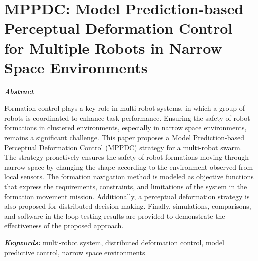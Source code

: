 \chapter{MPPDC: Model Prediction-based Perceptual Deformation Control for Multiple Robots in Narrow Space Environments}\label{paper3}

\vspace{1cm}

\noindent\textit{\textbf{Abstract}}

Formation control plays a key role in multi-robot systems, in which a group of robots is coordinated to enhance task performance. Ensuring the safety of robot formations in clustered environments, especially in narrow space environments, remains a significant challenge. This paper proposes a Model Prediction-based Perceptual Deformation Control (MPPDC) strategy for a multi-robot swarm. The strategy proactively ensures the safety of robot formations moving through narrow space by changing the shape according to the environment observed from local sensors. The formation navigation method is modeled as objective functions that express the requirements, constraints, and limitations of the system in the formation movement mission. Additionally, a perceptual deformation strategy is also proposed for distributed decision-making. Finally, simulations, comparisons, and software-in-the-loop testing results are provided to demonstrate the effectiveness of the proposed approach.

\noindent\textbf{\textit{Keywords:}}
multi-robot system, distributed deformation control, model predictive control, narrow space environments







